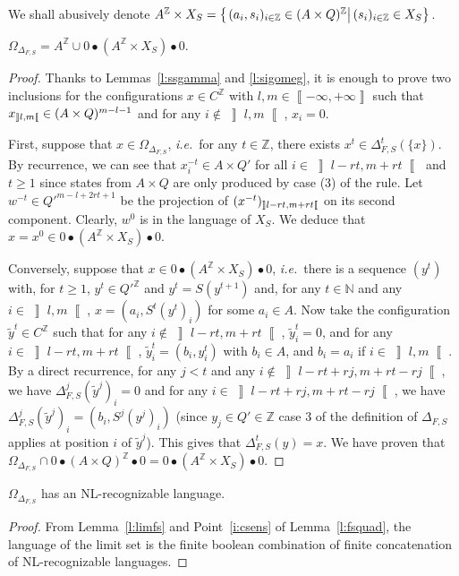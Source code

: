 \documentclass{jac}
\newcommand{\Z}{\mathbb Z}
\newcommand{\N}{\mathbb N}
\newcommand{\az}{{A^\Z}}
\newcommand{\sett}[2]{\left\{\left.#1\vphantom{#2}\right|#2\right\}}
\newcommand{\set}[3]{\sett{#1\in#2}{#3}}
\newcommand{\oo}[2]{\left\rrbracket #1,#2\right\llbracket}
\newcommand{\cc}[2]{\left\llbracket #1,#2\right\rrbracket}
\newcommand{\ie}{\textit{i.e.}\ }
\theoremstyle{definition}
\begin{document}
We shall abusively denote $\az\times X_S=\set{(a_i,s_i)_{i\in\Z}}{(A\times Q)^\Z}{(s_i)_{i\in\Z}\in X_S}$.
\begin{lem}\label{l:limfs}
 $\Omega_{\Delta_{F,S}}=\az\cup0\bullet(\az\times X_S)\bullet0$.
\end{lem}
\begin{proof}
Thanks to Lemmas~\ref{l:ssgamma} and \ref{l:sigomeg}, it is enough to prove two inclusions for the configurations $x\in C^\Z$ with $l,m\in\cc{-\infty}{+\infty}$ such that $x\soo lm\in(A\times Q)^{m-l-1}$ and for any $i\notin\oo lm$, $x_i=0$.

First, suppose that $x\in\Omega_{\Delta_{F,S}}$, \ie for any $t\in\Z$, there exists $x^t\in\Delta_{F,S}^t(\{x\})$. By recurrence, we can see that $x^{-t}_i\in A\times Q'$ for all $i\in\oo{l-rt}{m+rt}$ and $t\geq 1$ since states from $A\times Q$ are only produced by case (3) of the rule. Let $w^{-t}\in Q'^{m-l+2rt+1}$ be the projection of $(x^{-t})\soo{l-rt}{m+rt}$ on its second component. Clearly, $w^0$ is in the language of $X_S$. We deduce that $x=x^0\in0\bullet(\az\times X_S)\bullet0$.

Conversely, suppose that $x\in0\bullet(\az\times X_S)\bullet0$, \ie there is a sequence $(y^t)$ with, for $t\geq 1$, $y^t\in Q'^\Z$ and $y^t=S(y^{t+1})$ and, for any $t\in\N$ and any $i\in\oo lm$, $x=(a_i,S^t(y^t)_i)$ for some $a_i\in A$. Now take the configuration $\tilde y^t\in C^\Z$ such that for any $i\notin\oo{l-rt}{m+rt}$, $\tilde y^t_i=0$, and for any $i\in\oo{l-rt}{m+rt}$, $\tilde y^t_i=(b_i,y^t_i)$ with $b_i\in A$, and $b_i=a_i$ if $i\in\oo lm$. By a direct recurrence, for any $j<t$ and any $i\notin\oo{l-rt+rj}{m+rt-rj}$, we have $\Delta_{F,S}^j(\tilde y^j)_i=0$ and for any $i\in\oo{l-rt+rj}{m+rt-rj}$, we have $\Delta_{F,S}^j(\tilde y^j)_i=(b_i,S^j(y^j)_i)$ (since $y_j\in Q'\in\Z$ case 3 of the definition of $\Delta_{F,S}$ applies at position $i$ of $\tilde y^j$). This gives that $\Delta_{F,S}^t(y)=x$.
We have proven that $\Omega_{\Delta_{F,S}}\cap0\bullet(A\times Q)^\Z\bullet0=0\bullet(\az\times X_S)\bullet0$.
\end{proof}
\begin{cor}\label{c:csens}
 $\Omega_{\Delta_{F,S}}$ has an NL-recognizable language.
\end{cor}
\begin{proof}
 From Lemma~\ref{l:limfs} and Point~\ref{i:csens} of Lemma~\ref{l:fsquad}, the language of the limit set is the finite boolean combination of finite concatenation of NL-recognizable languages.
\end{proof}
\end{document}
